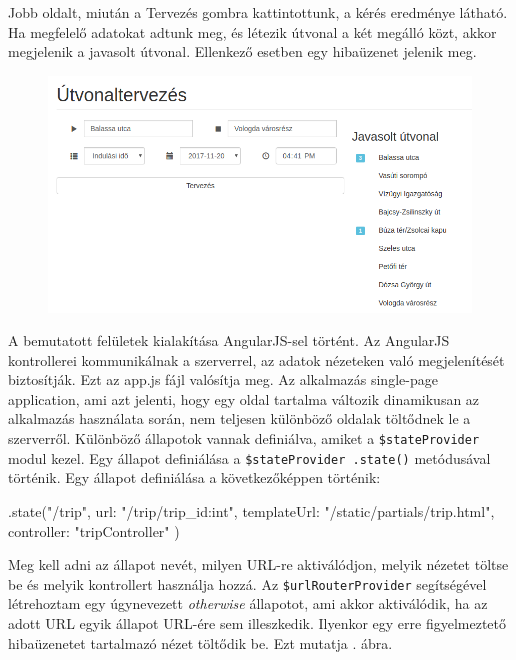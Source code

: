 Jobb oldalt, miután a Tervezés gombra kattintottunk, a kérés eredménye látható. Ha megfelelő adatokat adtunk meg, és létezik útvonal a két megálló közt, akkor megjelenik a javasolt útvonal. Ellenkező esetben egy hibaüzenet jelenik meg.

\begin{figure}[htb]
\centering
\includegraphics[scale=0.5]{kepek/trip_planner.png}
\caption{}
\label{fig:trip_planner}
\end{figure}


A bemutatott felületek kialakítása AngularJS-sel történt. Az AngularJS kontrollerei kommunikálnak a szerverrel, az adatok nézeteken való megjelenítését biztosítják. Ezt az app.js fájl valósítja meg.
Az alkalmazás single-page application, ami azt jelenti, hogy egy oldal tartalma változik dinamikusan az alkalmazás használata során, nem teljesen különböző oldalak töltődnek le a szerverről. Különböző állapotok vannak definiálva, amiket a \texttt{\$stateProvider} modul kezel. Egy állapot definiálása a \texttt{\$stateProvider .state()} metódusával történik.
Egy állapot definiálása a következőképpen történik:
\begin{cpp}
.state("/trip", {
            url: "/trip/{trip_id:int}",
            templateUrl: "/static/partials/trip.html",
            controller: "tripController"
        })
\end{cpp}
Meg kell adni az állapot nevét, milyen URL-re aktiválódjon, melyik nézetet töltse be és melyik kontrollert használja hozzá.
Az \texttt{\$urlRouterProvider} segítségével létrehoztam egy úgynevezett \textit{otherwise} állapotot, ami akkor aktiválódik, ha az adott URL egyik állapot URL-ére sem illeszkedik. Ilyenkor egy erre figyelmeztető hibaüzenetet tartalmazó nézet töltődik be. Ezt mutatja . ábra.

